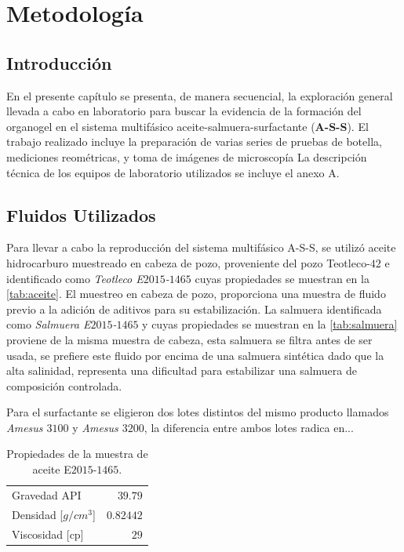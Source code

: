 \chapter{Metodología}
\label{chp:metodologia}

\section{Introducción}

En el presente capítulo se presenta, de manera secuencial, la exploración general llevada a cabo en laboratorio para buscar la evidencia de la formación del organogel en el sistema multifásico aceite-salmuera-surfactante (\textbf{A-S-S}). El trabajo realizado incluye la preparación de varias series de pruebas de botella, mediciones reométricas, y toma de imágenes de microscopía La descripción técnica de los equipos de laboratorio utilizados se incluye el anexo A.

\section{Fluidos Utilizados}
Para llevar a cabo la reproducción del sistema multifásico A-S-S, se utilizó aceite hidrocarburo muestreado en cabeza de pozo, proveniente del pozo Teotleco-$42$ e identificado como \emph{Teotleco E$2015$-$1465$} cuyas propiedades se muestran en la \autoref{tab:aceite}. El muestreo en cabeza de pozo, proporciona una muestra de fluido previo a la adición de aditivos para su estabilización. La salmuera identificada como \emph{Salmuera E$2015$-$1465$} y cuyas propiedades se muestran en la \autoref{tab:salmuera} proviene de la misma muestra de cabeza, esta salmuera se filtra antes de ser usada, se prefiere este fluido por encima de una salmuera sintética dado que la alta salinidad, representa una dificultad para estabilizar una salmuera de composición controlada.

Para el surfactante se eligieron dos lotes distintos del mismo producto llamados \emph{Amesus $3100$} y \emph{Amesus $3200$}, la diferencia entre ambos lotes radica en...

\begin{table}
\caption[Aceite E$2015$-$1465$] {Propiedades de la muestra de aceite E$2015$-$1465$.}
\centering
\begin{tabulary}{1.1\textwidth}{L |R}
    \toprule
    Gravedad API & $39.79$ \\
    Densidad [$g/cm^{3}$] & $0.82442$ \\
    Viscosidad [cp] & $29$  \\
    \midrule
    \bottomrule
\end{tabulary}
\label{tab:aceite}
\end{table}

